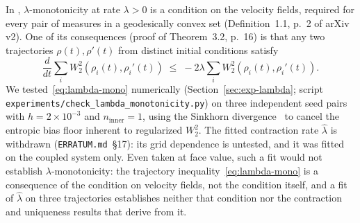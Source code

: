 \documentclass[11pt]{article}
\begin{document}
In \cite{conger2025monotone}, $\lambda$-monotonicity at rate
$\lambda > 0$ is a condition on the velocity fields, required for
every pair of measures in a geodesically convex set (Definition~1.1,
p.~2 of arXiv v2). One of its consequences (proof of Theorem~3.2,
p.~16) is that any two trajectories $\rho(t), \rho'(t)$ from distinct
initial conditions satisfy
\begin{equation}
  \frac{d}{dt} \sum_i W_2^2(\rho_i(t), \rho_i'(t))
    \;\le\; -2\lambda \sum_i W_2^2(\rho_i(t), \rho_i'(t)).
  \label{eq:lambda-mono}
\end{equation}
We tested~\eqref{eq:lambda-mono} numerically (Section~\ref{sec:exp-lambda};
script \texttt{experiments/check\_lambda\_monotonicity.py}) on three
independent seed pairs with $h = 2\times 10^{-3}$ and
$n_{\mathrm{inner}} = 1$, using the Sinkhorn divergence~%
\cite{feydy2019interpolating} to cancel the entropic bias floor
inherent to regularized $W_2^2$. The fitted contraction rate
$\hat\lambda$ is withdrawn (\texttt{ERRATUM.md}~\S17): its grid
dependence is untested, and it was fitted on the coupled system only. Even
taken at face value, such a fit would not establish
$\lambda$-monotonicity: the trajectory
inequality~\eqref{eq:lambda-mono} is a consequence of the condition
on velocity fields, not the condition itself, and a fit of
$\hat\lambda$ on three trajectories establishes neither that
condition nor the contraction and uniqueness results that
\cite{conger2025monotone} derive from it.
\end{document}

